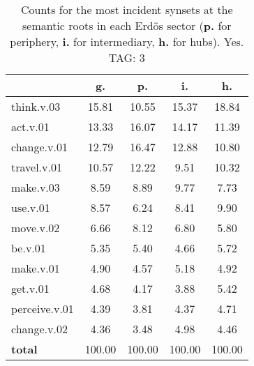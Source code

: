 \begin{table}[h!]
\begin{center}
\begin{tabular}{| l | c | c | c | c |}\hline
 & g. & p. & i. & h. \\\hline
think.v.03 & 15.81  & 10.55  & 15.37  & 18.84 \\\hline
act.v.01 & 13.33  & 16.07  & 14.17  & 11.39 \\\hline
change.v.01 & 12.79  & 16.47  & 12.88  & 10.80 \\\hline
travel.v.01 & 10.57  & 12.22  & 9.51  & 10.32 \\\hline
make.v.03 & 8.59  & 8.89  & 9.77  & 7.73 \\\hline
use.v.01 & 8.57  & 6.24  & 8.41  & 9.90 \\\hline
move.v.02 & 6.66  & 8.12  & 6.80  & 5.80 \\\hline
be.v.01 & 5.35  & 5.40  & 4.66  & 5.72 \\\hline
make.v.01 & 4.90  & 4.57  & 5.18  & 4.92 \\\hline
get.v.01 & 4.68  & 4.17  & 3.88  & 5.42 \\\hline
perceive.v.01 & 4.39  & 3.81  & 4.37  & 4.71 \\\hline
change.v.02 & 4.36  & 3.48  & 4.98  & 4.46 \\\hline
{{\bf total}} & 100.00  & 100.00  & 100.00  & 100.00 \\\hline
\end{tabular}
\caption{Counts for the most incident synsets at the semantic roots in each Erd\"os sector ({\bf p.} for periphery, {\bf i.} for intermediary, {\bf h.} for hubs). Yes. TAG: 3}
\end{center}
\end{table}